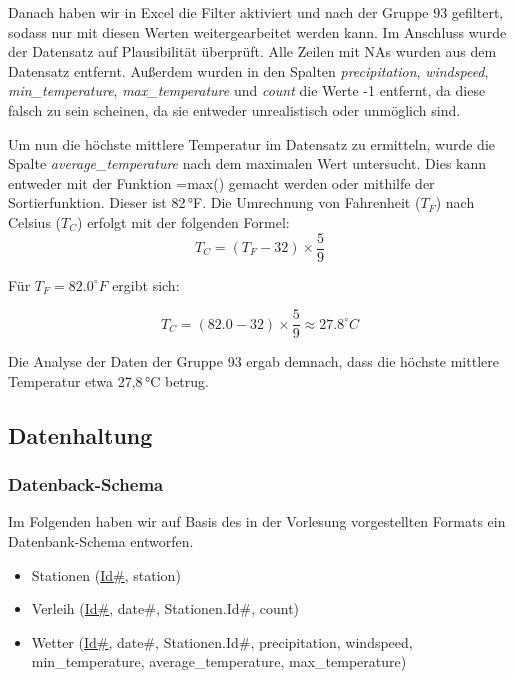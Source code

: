 \documentclass{article}
\begin{document}
    
\noindent Danach haben wir in Excel die Filter aktiviert und nach der Gruppe 93 gefiltert, sodass nur mit diesen Werten weitergearbeitet werden kann. Im Anschluss wurde der Datensatz auf Plausibilität überprüft. Alle Zeilen mit NAs wurden aus dem Datensatz entfernt. Außerdem wurden in den Spalten \textit{precipitation}, \textit{windspeed}, \textit{min\_temperature}, \textit{max\_temperature} und \textit{count} die Werte -1 entfernt, da diese falsch zu sein scheinen, da sie entweder unrealistisch oder unmöglich sind.

\noindent Um nun die höchste mittlere Temperatur im Datensatz zu ermitteln, wurde die Spalte \textit{average\_temperature} nach dem maximalen Wert untersucht. Dies kann entweder mit der Funktion =max() gemacht werden oder mithilfe der Sortierfunktion. Dieser ist 82\,°F. Die Umrechnung von Fahrenheit (\( T_F \)) nach Celsius (\( T_C \)) erfolgt mit der folgenden Formel:
\begin{equation}
\label{eq:3}
T_C = \left(T_F - 32\right) \times \frac{5}{9}
\end{equation}

Für \( T_F = 82.0^\circ F \) ergibt sich:

\[T_C = \left(82.0 - 32\right) \times \frac{5}{9} \approx 27.8^\circ C\]


\noindent Die Analyse der Daten der Gruppe 93 ergab demnach, dass die höchste mittlere Temperatur  etwa 27,8\,°C betrug. 

\subsection{Datenhaltung}
\subsubsection{Datenback-Schema}
Im Folgenden haben wir auf Basis des in der Vorlesung vorgestellten Formats ein Datenbank-Schema entworfen.

\begin{itemize}
    \item Stationen (\underline{Id\#}, station)
    \item Verleih (\underline{Id\#}, date\#, Stationen.Id\#, count)
    \item Wetter (\underline{Id\#}, date\#, Stationen.Id\#, precipitation, windspeed, \\ min\_temperature, average\_temperature, max\_temperature)
    
\end{itemize}
\end{document}
